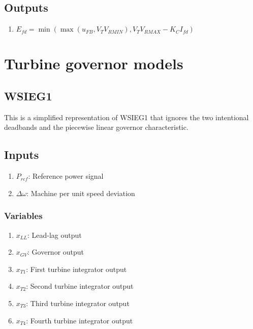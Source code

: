 \documentclass[12pt]{article}
\newcommand{\dw}{\Delta\omega}
\newcommand{\Efd}{E_{fd}}
\newcommand{\Ifd}{I_{fd}}
\begin{document}
\subsection{Outputs}
\begin{enumerate}
  \item $\Efd = \min(\max(u_{FB},V_TV_{RMIN}),V_TV_{RMAX} - K_C\Ifd)$
\end{enumerate}

\section{Turbine governor models}

\subsection{WSIEG1}
This is a simplified representation of WSIEG1 that ignores the two intentional deadbands and the piecewise linear governor characteristic.

\subsection{Inputs}
\begin{enumerate}
  \item $P_{ref}$: Reference power signal
  \item $\dw$: Machine per unit speed deviation
\end{enumerate}

\subsubsection{Variables}
\begin{enumerate}
  \item $x_{LL}$: Lead-lag output
  \item $x_{GV}$: Governor output
  \item $x_{T1}$: First turbine integrator output
  \item $x_{T2}$: Second turbine integrator output
  \item $x_{T3}$: Third turbine integrator output
  \item $x_{T4}$: Fourth turbine integrator output
\end{enumerate}
\end{document}
